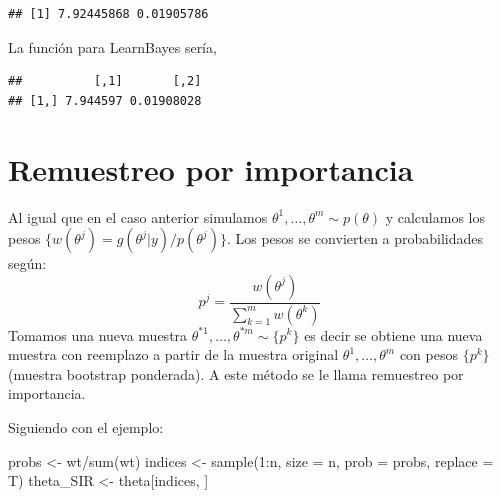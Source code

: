 \documentclass[
  12pt,
]{book}
\newenvironment{Shaded}{\begin{snugshade}}{\end{snugshade}}
\newcommand{\AttributeTok}[1]{\textcolor[rgb]{0.77,0.63,0.00}{#1}}
\newcommand{\ControlFlowTok}[1]{\textcolor[rgb]{0.13,0.29,0.53}{\textbf{#1}}}
\newcommand{\DecValTok}[1]{\textcolor[rgb]{0.00,0.00,0.81}{#1}}
\newcommand{\FunctionTok}[1]{\textcolor[rgb]{0.00,0.00,0.00}{#1}}
\newcommand{\NormalTok}[1]{#1}
\newcommand{\OtherTok}[1]{\textcolor[rgb]{0.56,0.35,0.01}{#1}}
\newcommand{\SpecialCharTok}[1]{\textcolor[rgb]{0.00,0.00,0.00}{#1}}
\theoremstyle{definition}
\theoremstyle{definition}
\theoremstyle{definition}
\theoremstyle{definition}
\theoremstyle{remark}
\begin{document}
\begin{verbatim}
## [1] 7.92445868 0.01905786
\end{verbatim}

La función para LearnBayes sería,

\begin{Shaded}
\end{Shaded}

\begin{verbatim}
##          [,1]       [,2]
## [1,] 7.944597 0.01908028
\end{verbatim}

\hypertarget{remuestreo-por-importancia}{%
\section{Remuestreo por importancia}\label{remuestreo-por-importancia}}

Al igual que en el caso anterior simulamos \(\theta^1,\ldots,\theta^m\sim p(\theta)\) y calculamos los pesos \(\{w(\theta^j)=g(\theta^j|y)/p(\theta^j)\}\). Los pesos se convierten a probabilidades según:
\[p^j=\frac{w(\theta^j)}{\sum_{k=1}^mw(\theta^k)}\]
Tomamos una nueva muestra \(\theta^{*1},\ldots,\theta^{*m}\sim \{p^k\}\) es decir se obtiene una nueva muestra con reemplazo a partir de la muestra original \(\theta^1,\ldots,\theta^m\) con pesos \(\{p^k\}\) (muestra bootstrap ponderada). A este método se le llama remuestreo por importancia.

Siguiendo con el ejemplo:

\begin{Shaded}
\begin{Highlighting}[]
\NormalTok{probs }\OtherTok{\textless{}{-}}\NormalTok{ wt}\SpecialCharTok{/}\FunctionTok{sum}\NormalTok{(wt)}
\NormalTok{indices }\OtherTok{\textless{}{-}} \FunctionTok{sample}\NormalTok{(}\DecValTok{1}\SpecialCharTok{:}\NormalTok{n, }\AttributeTok{size =}\NormalTok{ n, }\AttributeTok{prob =}\NormalTok{ probs, }\AttributeTok{replace =}\NormalTok{ T)}
\NormalTok{theta\_SIR }\OtherTok{\textless{}{-}}\NormalTok{ theta[indices, ]}
\end{Highlighting}
\end{Shaded}
\end{document}
